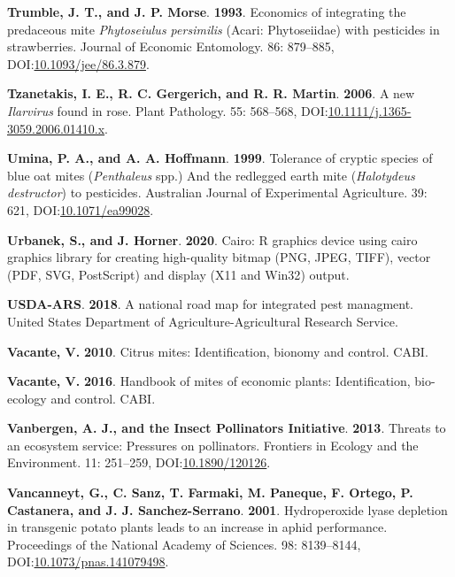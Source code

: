 \documentclass[12pt,final,CPage]{ufthesis}
\newlength{\cslhangindent}
\newenvironment{CSLReferences}[2] %
{%
	\setlength{\parindent}{0pt}
	\ifodd #1 \everypar{\setlength{\hangindent}{\cslhangindent}}\ignorespaces\fi
	\ifnum #2 > 0
	\setlength{\parskip}{#2\baselineskip}
	\fi
}%
{}
\begin{document}
{\begin{CSLReferences}{1}{0}
  \leavevmode{}%
  \textbf{Trumble, J. T., and J. P. Morse}. \textbf{1993}. Economics of integrating the predaceous mite {\emph{Phytoseiulus persimilis}} ({{Acari}: {Phytoseiidae}}) with pesticides in strawberries. Journal of Economic Entomology. 86: 879--885, DOI:\href{https://doi.org/10.1093/jee/86.3.879}{10.1093/jee/86.3.879}.

  \leavevmode{}%
  \textbf{Tzanetakis, I. E., R. C. Gergerich, and R. R. Martin}. \textbf{2006}. A new {\emph{Ilarvirus}} found in rose. Plant Pathology. 55: 568--568, DOI:\href{https://doi.org/10.1111/j.1365-3059.2006.01410.x}{10.1111/j.1365-3059.2006.01410.x}.

  \leavevmode{}%
  \textbf{Umina, P. A., and A. A. Hoffmann}. \textbf{1999}. Tolerance of cryptic species of blue oat mites ({\emph{Penthaleus}} spp.) And the redlegged earth mite ({\emph{Halotydeus destructor}}) to pesticides. Australian Journal of Experimental Agriculture. 39: 621, DOI:\href{https://doi.org/10.1071/ea99028}{10.1071/ea99028}.

  \leavevmode{}%
  \textbf{Urbanek, S., and J. Horner}. \textbf{2020}. Cairo: {R} graphics device using cairo graphics library for creating high-quality bitmap ({PNG}, {JPEG}, {TIFF}), vector ({PDF}, {SVG}, {PostScript}) and display ({X11} and {Win32}) output.

  \leavevmode{}%
  \textbf{USDA-ARS}. \textbf{2018}. A national road map for integrated pest managment. {United States} Department of Agriculture-Agricultural Research Service.

  \leavevmode{}%
  \textbf{Vacante, V.} \textbf{2010}. Citrus mites: Identification, bionomy and control. CABI.

  \leavevmode{}%
  \textbf{Vacante, V.} \textbf{2016}. Handbook of mites of economic plants: Identification, bio-ecology and control. CABI.

  \leavevmode{}%
  \textbf{Vanbergen, A. J., and the Insect Pollinators Initiative}. \textbf{2013}. Threats to an ecosystem service: Pressures on pollinators. Frontiers in Ecology and the Environment. 11: 251--259, DOI:\href{https://doi.org/10.1890/120126}{10.1890/120126}.

  \leavevmode{}%
  \textbf{Vancanneyt, G., C. Sanz, T. Farmaki, M. Paneque, F. Ortego, P. Castanera, and J. J. Sanchez-Serrano}. \textbf{2001}. Hydroperoxide lyase depletion in transgenic potato plants leads to an increase in aphid performance. Proceedings of the National Academy of Sciences. 98: 8139--8144, DOI:\href{https://doi.org/10.1073/pnas.141079498}{10.1073/pnas.141079498}.


\end{CSLReferences}}
\end{document}
